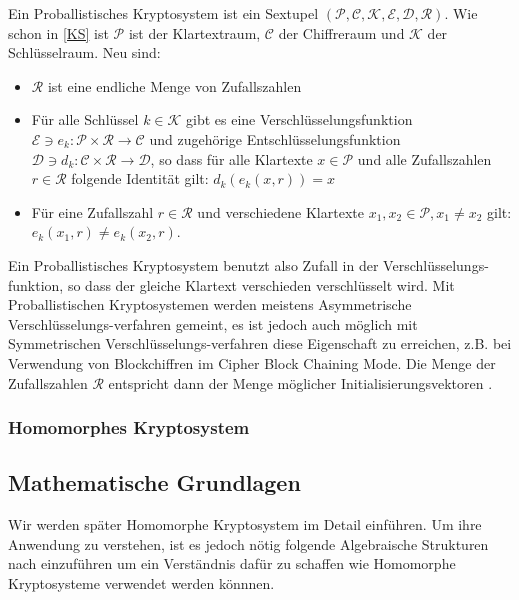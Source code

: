 \begin{theorem}
	\label{PKS}
	Ein Proballistisches Kryptosystem ist ein Sextupel $(\mathcal{P},\mathcal{C},\mathcal{K},\mathcal{E},\mathcal{D},\mathcal{R})$. Wie schon in \ref{KS} ist $\mathcal{P}$ ist der Klartextraum, $\mathcal{C}$ der Chiffreraum und $\mathcal{K}$ der Schlüsselraum. Neu sind:
	\begin{itemize}
		\item $\mathcal{R}$ ist eine endliche Menge von Zufallszahlen
		\item Für alle Schlüssel $k\in \mathcal{K}$ gibt es eine Verschlüsselungsfunktion $\mathcal{E}\ni e_k:\mathcal{P}\times\mathcal{R}\rightarrow\mathcal{C}$ und zugehörige Entschlüsselungsfunktion $\mathcal{D}\ni d_k:\mathcal{C}\times\mathcal{R}\rightarrow\mathcal{D}$, so dass für alle Klartexte $x\in\mathcal{P}$ und alle Zufallszahlen $r\in\mathcal{R}$ folgende Identität gilt: $d_k(e_k(x,r)) = x$ 
		\item Für eine Zufallszahl $r\in\mathcal{R}$ und verschiedene Klartexte $x_1,x_2\in\mathcal{P}, x_1\neq x_2$ gilt: $e_k(x_1,r)\neq e_k(x_2,r)$.
		
	\end{itemize}
\end{theorem}

Ein Proballistisches Kryptosystem benutzt also Zufall in der Verschlüsselungs-funktion, so dass der gleiche Klartext verschieden verschlüsselt wird. Mit Proballistischen Kryptosystemen werden meistens Asymmetrische Verschlüsselungs-verfahren gemeint, es ist jedoch auch möglich mit Symmetrischen Verschlüsselungs-verfahren diese Eigenschaft zu erreichen, z.B. bei Verwendung von Blockchiffren im Cipher Block Chaining Mode. Die Menge der Zufallszahlen $\mathcal{R}$ entspricht dann der Menge möglicher Initialisierungsvektoren \cite{mm2015itsec}. 




\subsubsection{Homomorphes Kryptosystem}

\subsection{Mathematische Grundlagen}

Wir werden später Homomorphe Kryptosystem im Detail einführen. Um ihre Anwendung zu verstehen, ist es jedoch nötig folgende Algebraische Strukturen nach \cite{tr2015la} einzuführen um ein Verständnis dafür zu schaffen wie Homomorphe Kryptosysteme verwendet werden könnnen.

